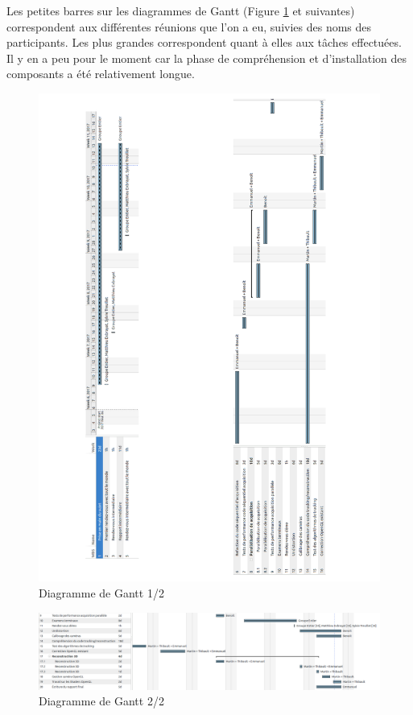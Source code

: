 Les petites barres sur les diagrammes de Gantt (Figure \ref{gantt} et suivantes) correspondent aux différentes réunions que l'on a eu, suivies des noms des participants. Les plus grandes correspondent quant à elles aux tâches effectuées. Il y en a peu pour le moment car la phase de compréhension et d'installation des composants a été relativement longue.

\newpage
\begin{figure}
	\begin{center}
		\includegraphics[scale=0.3]{Modules/Picture/gantt_0_1}
		\caption{Diagramme de Gantt 1/2}
		\label{gantt}
	\end{center}
\end{figure}

\newpage
\begin{figure}
	\begin{center}
		\includegraphics[scale=0.3, angle=90]{Modules/Picture/gantt_final_2}
		\caption{Diagramme de Gantt 2/2}
	\end{center}
\end{figure}

